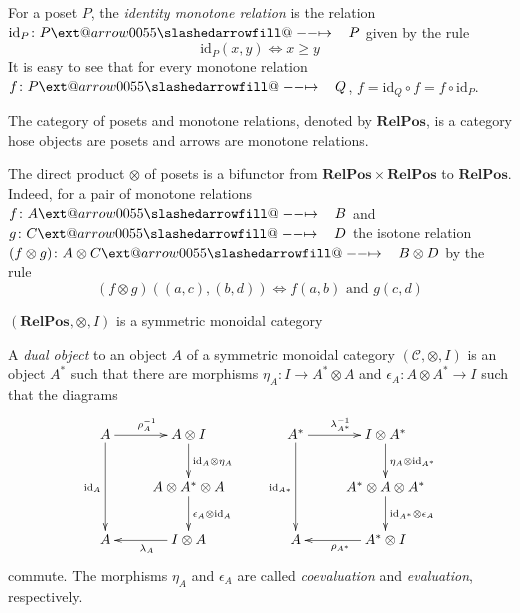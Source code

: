 \documentclass{beamer}
\makeatletter
\newcommand{\id}{\mathrm{id}}
\newcommand{\C}{\mathcal{C}}
\newcommand{\RelPos}{\mathbf{RelPos}}
\def\slashedarrowfill@#1#2#3#4#5{%
  $\m@th\thickmuskip0mu\medmuskip\thickmuskip\thinmuskip\thickmuskip
  \relax#5#1\mkern-7mu%
  \cleaders\hbox{$#5\mkern-2mu#2\mkern-2mu$}\hfill
  \mathclap{#3}\mathclap{#2}%
  \cleaders\hbox{$#5\mkern-2mu#2\mkern-2mu$}\hfill
  \mkern-7mu#4$%
}
\def\rightslashedarrowfill@{%
  \slashedarrowfill@\relbar\relbar\mapstochar\rightarrow}
\newcommand\xslashedrightarrow[2][]{%
  \ext@arrow 0055{\rightslashedarrowfill@}{#1}{#2}}
\newcommand{\sto}{\xslashedrightarrow{\hskip 1pc}}
\makeatother
\begin{document}
\begin{frame}
For a poset $P$, the {\em identity monotone relation} is the relation
$\id_P\colon P\sto P$ given by the rule
$$
\id_P(x,y)\Leftrightarrow x\geq y
$$
It is easy to see that for every monotone relation $f\colon P\sto Q$,
$f=\id_Q\circ f=f\circ\id_P$.
\end{frame}

\begin{frame}
The category of posets and monotone relations, denoted by $\RelPos$, is a category
hose objects are posets and arrows are monotone relations.

\end{frame}
\begin{frame}
The direct product $\otimes$ of posets is a bifunctor from
$\RelPos\times\RelPos$ to $\RelPos$. Indeed, for a pair of monotone relations
$f\colon A\sto B$ and $g\colon C\sto D$ the isotone relation $(f\otimes g)\colon
A\otimes C\sto B\otimes D$ by the rule
$$
(f\otimes g)((a,c),(b,d)) \Leftrightarrow f(a,b)\text{ and }g(c,d)
$$
\end{frame}
\begin{frame}
$(\RelPos,\otimes,I)$ is a symmetric
monoidal category
\end{frame}
\begin{frame}

A {\em dual object} to an object $A$ of a symmetric monoidal category $(\C,\otimes,I)$ is an object
$A^*$ such that there are morphisms
$\eta_A\colon I\to A^*\otimes A$ and $\epsilon_A\colon A\otimes A^*\to I$ such
that the diagrams
\begin{equation}
\label{diag:compact}
\xymatrix{
A
	\ar[r]^{\rho_A^{-1}}
	\ar[dd]_{\id_A}
&
A\otimes I
	\ar[d]^{\id_A\otimes\eta_A}
\\
~
&
A\otimes A^*\otimes A
	\ar[d]^{\epsilon_A\otimes\id_A}
\\
A
&
I\otimes A
	\ar[l]^{\lambda_A}
}
\qquad
\xymatrix{
A^*
	\ar[r]^{\lambda_{A^*}^{-1}}
	\ar[dd]_{\id_{A*}}
&
I\otimes A^*
	\ar[d]^{\eta_A\otimes\id_{A^*}}
\\
~
&
A^*\otimes A\otimes A^*
	\ar[d]^{\id_{A^*}\otimes\epsilon_A}
\\
A
&
A^*\otimes I
	\ar[l]^{\rho_{A^*}}
}
\end{equation}
commute. The morphisms $\eta_A$ and $\epsilon_A$ are called {\em coevaluation} and
{\em evaluation}, respectively. 
\end{frame}
\end{document}
